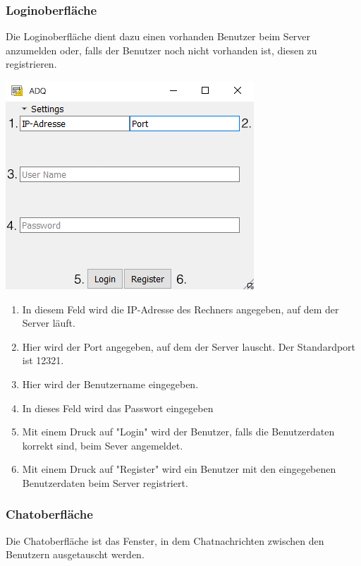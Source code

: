 \documentclass[12pt,a4paper,bibliography=totocnumbered,listof=totocnumbered]{scrartcl}
\begin{document}
\subsubsection{Loginoberfläche}
Die Loginoberfläche dient dazu einen vorhanden Benutzer beim Server anzumelden oder, falls der Benutzer noch nicht vorhanden ist, diesen zu registrieren.

\begin{minipage}{\linewidth}
	\centering
	\includegraphics[width=0.85\linewidth]{img/Client_Login.png}
	
\end{minipage}
\vspace{1em}
\begin{enumerate}
	\item In diesem Feld wird die IP-Adresse des Rechners angegeben, auf dem der Server läuft.
	\item Hier wird der Port angegeben, auf dem der Server lauscht. Der Standardport ist 12321. 
	\item Hier wird der Benutzername eingegeben.
	\item In dieses Feld wird das Passwort eingegeben
	\item Mit einem Druck auf "Login" wird der Benutzer, falls die Benutzerdaten korrekt sind, beim Sever angemeldet.
	\item Mit einem Druck auf "Register" wird ein Benutzer mit den eingegebenen Benutzerdaten beim Server registriert.
\end{enumerate}
\subsubsection{Chatoberfläche}
Die Chatoberfläche ist das Fenster, in dem Chatnachrichten zwischen den Benutzern ausgetauscht werden.
\end{document}
